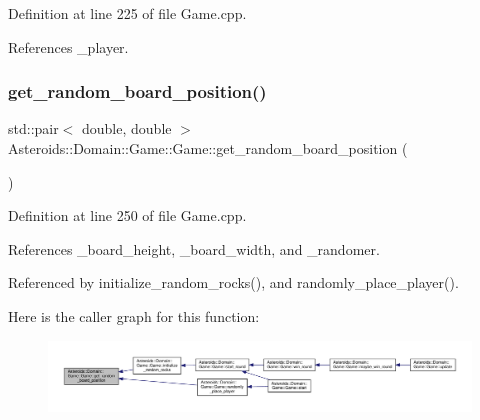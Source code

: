 Definition at line 225 of file Game.\+cpp.



References \+\_\+player.

\mbox{\label{classAsteroids_1_1Domain_1_1Game_1_1Game_a798922774fed23c593a476338acf7100}} 
\subsubsection{\texorpdfstring{get\+\_\+random\+\_\+board\+\_\+position()}{get\_random\_board\_position()}}
{\footnotesize\ttfamily std\+::pair$<$ double, double $>$ Asteroids\+::\+Domain\+::\+Game\+::\+Game\+::get\+\_\+random\+\_\+board\+\_\+position (\begin{DoxyParamCaption}{ }\end{DoxyParamCaption})\hspace{0.3cm}{\ttfamily [private]}}



Definition at line 250 of file Game.\+cpp.



References \+\_\+board\+\_\+height, \+\_\+board\+\_\+width, and \+\_\+randomer.



Referenced by initialize\+\_\+random\+\_\+rocks(), and randomly\+\_\+place\+\_\+player().

Here is the caller graph for this function\+:\nopagebreak
\begin{figure}[H]
\begin{center}
\leavevmode
\includegraphics[width=350pt]{classAsteroids_1_1Domain_1_1Game_1_1Game_a798922774fed23c593a476338acf7100_icgraph}
\end{center}
\end{figure}
\mbox{\label{classAsteroids_1_1Domain_1_1Game_1_1Game_abc24d11951291f8ceab1d20a6652b46e}} 

